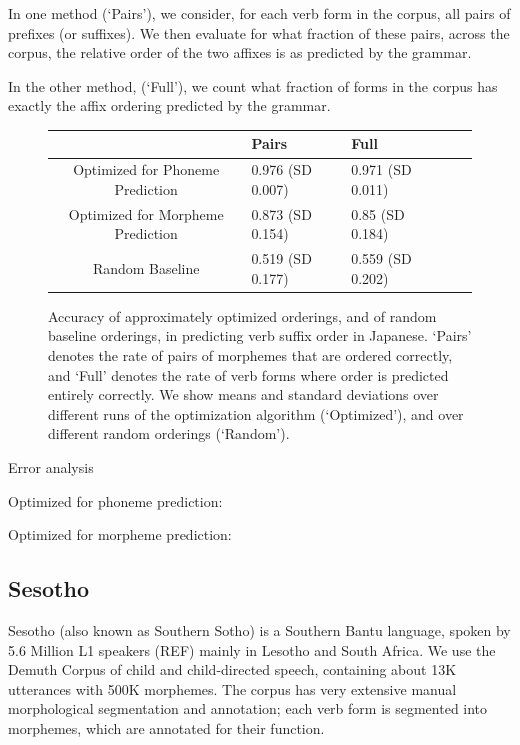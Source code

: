 In one method (`Pairs'), we consider, for each verb form in the corpus, all pairs of prefixes (or suffixes).
We then evaluate for what fraction of these pairs, across the corpus, the relative order of the two affixes is as predicted by the grammar.

In the other method, (`Full'), we count what fraction of forms in the corpus has exactly the affix ordering predicted by the grammar.


\begin{figure}
\begin{center}
\begin{tabular}{c||llll}
             &       Pairs & Full \\ \hline\hline
Optimized for Phoneme Prediction   &   0.976 (SD 0.007) & 0.971 (SD 0.011) \\
Optimized for Morpheme Prediction  &   0.873 (SD 0.154) & 0.85 (SD 0.184) \\
Random Baseline     &  0.519 (SD 0.177) & 0.559 (SD 0.202) \\
\end{tabular}
\end{center}
\caption{Accuracy of approximately optimized orderings, and of random baseline orderings, in predicting verb suffix order in Japanese. `Pairs' denotes the rate of pairs of morphemes that are ordered correctly, and `Full' denotes the rate of verb forms where order is predicted entirely correctly. We show means and standard deviations over different runs of the optimization algorithm (`Optimized'), and over different random orderings (`Random').}\label{fig:acc-japanese}
\end{figure}

Error analysis

Optimized for phoneme prediction:

Optimized for morpheme prediction:





\subsection{Sesotho}

Sesotho (also known as Southern Sotho) is a Southern Bantu language, spoken by 5.6 Million L1 speakers (REF) mainly in Lesotho and South Africa.
We use the Demuth Corpus \citep{demuth1992acquisition} of child and child-directed speech, containing about 13K utterances with 500K morphemes.
The corpus has very extensive manual morphological segmentation and annotation; each verb form is segmented into morphemes, which are annotated for their function.

